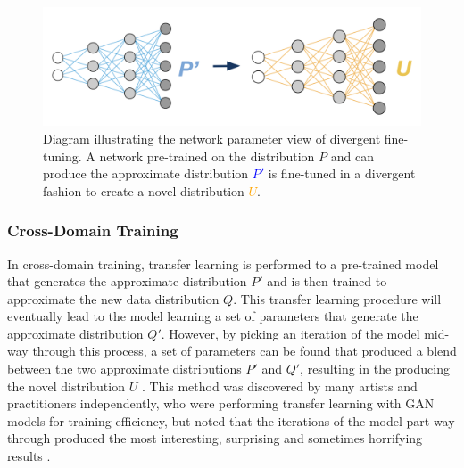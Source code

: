 \begin{figure}[!htbp]
    \centering
    \includegraphics[width=1\textwidth]{figures/c6_active_div/diagrams/divergent_finetuning.png}
    \caption[Diagram illustrating the network parameter view of divergent fine-tuning.]{Diagram illustrating the network parameter view of divergent fine-tuning. A network pre-trained on the distribution $P$ and can produce the approximate distribution \textcolor{blue}{$P'$} is fine-tuned in a divergent fashion to create a novel distribution \textcolor{orange}{$U$}.}
  \label{fig:c6:divergent-finetuning}
  \end{figure}

\subsubsection{Cross-Domain Training} 

In cross-domain training, transfer learning is performed to a pre-trained model that generates the approximate distribution $P'$ and is then trained to approximate the new data distribution $Q$. 
This transfer learning procedure will eventually lead to the model learning a set of parameters that generate the approximate distribution $Q'$. 
However, by picking an iteration of the model mid-way through this process, a set of parameters can be found that produced a blend between the two approximate distributions $P'$ and $Q'$, resulting in the producing the novel distribution $U$ \citep{schultz2020mixed}. 
This method was discovered by many artists and practitioners independently, who were performing transfer learning with GAN models for training efficiency, but noted that the iterations of the model part-way through produced the most interesting, surprising and sometimes horrifying results \citep{adler2020transfer,black2020noface,mariansky2020transfer,shane2020cat}.

